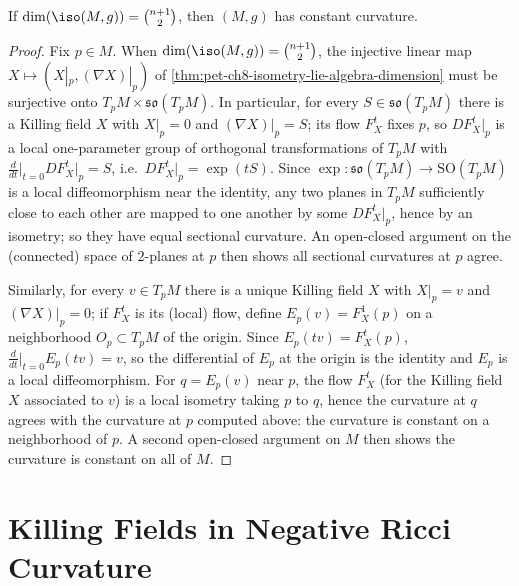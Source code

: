 \begin{theorem}
  \label{thm:pet-ch8-maximal-symmetry-constant-curvature}
  If $\dim(\iso(M,g))=\binom{n+1}2$, then $(M,g)$ has constant curvature.
\end{theorem}
\begin{proof}
  Fix $p\in M$. When $\dim(\iso(M,g))=\binom{n+1}2$, the injective linear map
  $X\mapsto(X|_p,(\nabla X)|_p)$ of \cref{thm:pet-ch8-isometry-lie-algebra-dimension}
  must be surjective onto $T_pM\times\mathfrak{so}(T_pM)$. In particular, for
  every $S\in\mathfrak{so}(T_pM)$ there is a Killing field $X$ with $X|_p=0$
  and $(\nabla X)|_p=S$; its flow $F^t_X$ fixes $p$, so $DF^t_X|_p$ is a local
  one-parameter group of orthogonal transformations of $T_pM$ with
  $\frac{d}{dt}\big|_{t=0}DF^t_X|_p=S$, i.e.\ $DF^t_X|_p=\exp(tS)$. Since
  $\exp:\mathfrak{so}(T_pM)\to\mathrm{SO}(T_pM)$ is a local diffeomorphism near
  the identity, any two planes in $T_pM$ sufficiently close to each other are
  mapped to one another by some $DF^t_X|_p$, hence by an isometry; so they have
  equal sectional curvature. An open-closed argument on the (connected) space of
  $2$-planes at $p$ then shows all sectional curvatures at $p$ agree.

  Similarly, for every $v\in T_pM$ there is a unique Killing field $X$ with
  $X|_p=v$ and $(\nabla X)|_p=0$; if $F^t_X$ is its (local) flow, define
  $E_p(v)=F^1_X(p)$ on a neighborhood $O_p\subset T_pM$ of the origin. Since
  $E_p(tv)=F^t_X(p)$, $\frac{d}{dt}\big|_{t=0}E_p(tv)=v$, so the differential of
  $E_p$ at the origin is the identity and $E_p$ is a local diffeomorphism. For
  $q=E_p(v)$ near $p$, the flow $F^t_X$ (for the Killing field $X$ associated to
  $v$) is a local isometry taking $p$ to $q$, hence the curvature at $q$ agrees
  with the curvature at $p$ computed above: the curvature is constant on a
  neighborhood of $p$. A second open-closed argument on $M$ then shows the
  curvature is constant on all of $M$.
\end{proof}

\section{Killing Fields in Negative Ricci Curvature}

